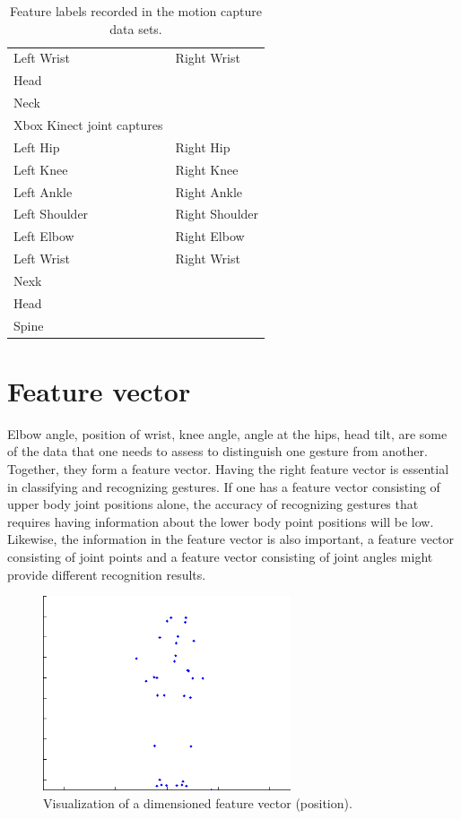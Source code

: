\documentclass[]{report}   %
\begin{document}
\begin{table}[htbp]
\begin{tabular}{l|l}
		Left Wrist & Right Wrist \\
		Head & \\
		Neck & \\
		\midrule
    Xbox Kinect joint captures  \\
	\midrule
		Left Hip	&  Right Hip	\\
		Left Knee&	Right Knee \\
		Left Ankle & Right Ankle \\
		Left Shoulder & Right Shoulder \\
		Left Elbow & Right Elbow \\
		Left Wrist & Right Wrist \\
		Nexk & \\
		Head & \\
		Spine & \\		
	\bottomrule
	\end{tabular}
	\caption{Feature labels recorded in the motion capture data sets.}
	\label{tab:data setfeatures}
\end{table}


\section{Feature vector}Elbow angle, position of wrist, knee angle, angle at the hips, head tilt, are some of the data that one needs to assess to distinguish one gesture from another. Together, they form a feature vector. Having the right feature vector is essential in classifying and recognizing gestures. If one has a feature vector consisting of upper body joint positions alone, the accuracy of recognizing gestures that requires having information about the lower body point positions will be low. Likewise, the information in the feature vector is also important, a feature vector consisting of joint points and a feature vector consisting of joint angles might provide different recognition results.

\begin{figure}[htbp]
	\centering
		\includegraphics[width=0.65\textwidth]{dimdata.png}
	\caption{Visualization of a dimensioned feature vector (position).}
	\label{fig:dimdata}
\end{figure}
\end{document}
